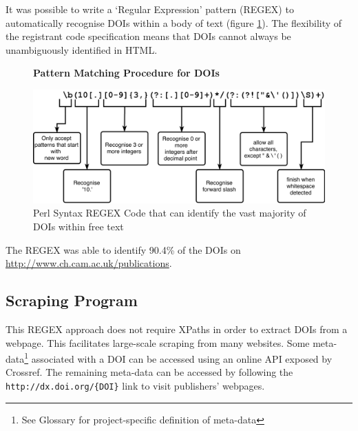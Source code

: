 It was possible to write a `Regular Expression' pattern (REGEX) to automatically recognise DOIs within a body of text (figure \ref{fig:REGEX}). The flexibility of the registrant code specification means that DOIs cannot always be unambiguously identified in HTML. 
\begin{figure}[H]
    \centering
    \textbf{Pattern Matching Procedure for DOIs}\par\medskip
    \includegraphics[width=\textwidth]{Data_Acquisition/Regex.png}
    \caption[Pattern Matching Procdure for DOIs]{Perl Syntax REGEX Code that can identify the vast majority of DOIs within free text} \label{fig:REGEX}
\end{figure}
The REGEX was able to identify 90.4\% of the DOIs on \url{http://www.ch.cam.ac.uk/publications}. 
\subsection{Scraping Program}
\label{sec:SCRAPING_PROGRAM}
This REGEX approach does not require XPaths in order to extract DOIs from a webpage. This facilitates large-scale scraping from many websites. Some meta-data\footnote{See Glossary for project-specific definition of meta-data} associated with a DOI can be accessed using an online API exposed by Crossref. The remaining meta-data can be accessed by following the \texttt{http://dx.doi.org/\{DOI\}} link to visit publishers' webpages.


